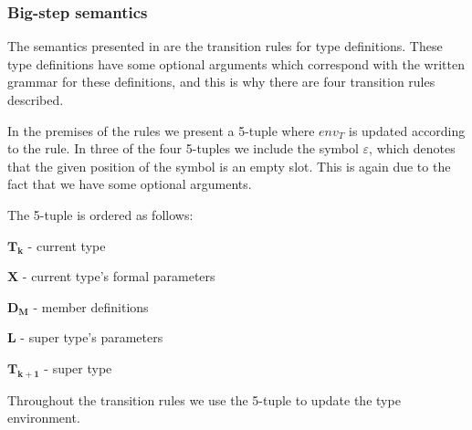 \subsubsection{Big-step semantics}

The semantics presented in  are the transition rules
for type definitions.  These type definitions have some optional arguments which
correspond with the written grammar for these definitions, and this is why there
are four transition rules described.



In the premises of the rules we present a 5-tuple where $env_{T}$ is updated
according to the rule. In three of the four 5-tuples we include the symbol
$\varepsilon$, which denotes that the given position of the symbol is an empty
slot. This is again due to the fact that we have some optional arguments.

The 5-tuple is ordered as follows:

\begin{nlist}
\item $\mathbf{T_{k}}$ - current type
  \item $\mathbf{X}$ - current type's formal parameters
  \item $\mathbf{D_{M}}$ - member definitions
  \item $\mathbf{L}$ - super type's parameters
  \item $\mathbf{T_{k+1}}$ - super type
\end{nlist}

Throughout the transition rules we use the 5-tuple to update the type environment.
